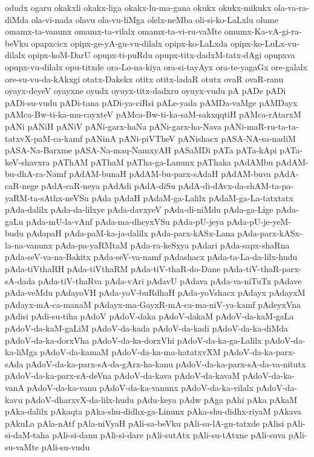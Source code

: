 {odudx
ogaru
okakxli
okakx-liga
okakx-lu-ma-gana
okukx
okukx-mikukx
ola-va-ra-diMda
ola-vi-nada
olavu
ola-vu-liMga
olelx-neMba
oli-si-ko-LaLxlu
olume
omamx-ta-vanunx
omamx-ta-vilalx
omamx-ta-vi-ru-vaMte
omumx-Ka-vA-gi-ra-beVku
opapxcicx
opipx-ge-yA-gu-vu-dilalx
opipx-ko-LaLxda
opipx-ko-LuLx-vu-dilalx
opipx-koM-DarU
opupx-ti-puRdu
opupx-titx-dadxM-tatx-dAgi
opupxva
opupx-vu-dilalx
opu-titxde
ora-Lo-na-kiya
ora-si-tayAyx
ora-te-yagaGx
ore-galalx
ore-su-vu-da-kAkxgi
otatx-Dakekx
otitx
otitx-ladaR
otutx
ovaR
ovaR-ranu
oyayx-deyeV
oyayxne
oyudx
oyuyx-titx-dadxru
oyuyx-vudu
pA
pADe
pADi
pADi-su-vudu
pADi-tana
pADi-ya-ciRsi
pALe-yada
pAMDa-vaMge
pAMDayx
pAMca-Bw-ti-ka-mu-cayxteV
pAMca-Bw-ti-ka-saM-sakxqqtiH
pAMca-rAtarxM
pANi
pANiH
pANiV
pANi-garx-haNa
pANi-garx-ha-Nava
pANi-maR-ru-ta-ta-tatxvX-paM-ca-kamf
pANinA
pANi-piVTheV
pANishacx
pASA-NA-sa-nadiM
pASA-Na-Barxme
pASA-Na-maq-NamxyAH
pASaMDi
pATa
pATa-kApi
pATa-keV-shavxra
pAThAM
pAThaM
pATha-ga-Lanunx
pAThaka
pAdAMbu
pAdAM-bu-dhA-ra-Namf
pAdAM-bunaH
pAdAM-bu-parx-sAdaH
pAdAM-buva
pAdA-caR-nege
pAdA-caR-neya
pAdAdi
pAdA-diSu
pAdA-di-dAvx-da-shAM-ta-pa-yaRM-ta-sAthx-neVSu
pAda
pAdaH
pAdaM-ga-Lalilx
pAdaM-ga-La-tatxtatx
pAda-dalilx
pAda-da-lilxye
pAda-davxyeV
pAda-di-niMdu
pAda-ga-Lige
pAda-gaLu
pAda-mU-la-vAnf
pAda-ma-dheyxVSu
pAda-pU-jeya
pAda-pU-je-yeM-budu
pAdapaH
pAda-paM-ka-ja-dalilx
pAda-parx-kASx-Lana
pAda-parx-kASx-la-na-vanunx
pAda-pa-yaRMtaM
pAda-ra-keSxya
pAdari
pAda-sapx-shaRna
pAda-seV-va-na-Bakitx
pAda-seV-va-namf
pAdashacx
pAda-ta-La-da-lilx-hudu
pAda-tiVthaRH
pAda-tiVthaRM
pAda-tiV-thaR-do-Dane
pAda-tiV-thaR-parx-sA-dada
pAda-tiV-thaRva
pAda-vAri
pAdavU
pAdava
pAda-va-niTuTx
pAdave
pAda-veMdu
pAdayoVH
pAda-yoV-buRdhaH
pAda-yoVshacx
pAdayx
pAdayxM
pAdayx-mA-ca-manaM
pAdayx-ma-GayxR-mA-ca-ma-niV-ya-kamf
pAdeyxVna
pAdisi
pAdi-su-tiha
pAdoV
pAdoV-daka
pAdoV-dakaM
pAdoV-da-kaM-gaLa
pAdoV-da-kaM-gaLiM
pAdoV-da-kada
pAdoV-da-kadi
pAdoV-da-ka-diMda
pAdoV-da-ka-dorxVha
pAdoV-da-ka-dorxVhi
pAdoV-da-ka-ga-Lalilx
pAdoV-da-ka-liMga
pAdoV-da-kamaM
pAdoV-da-ka-ma-hatatxvXM
pAdoV-da-ka-parx-sAda
pAdoV-da-ka-parx-sA-da-gArx-ha-kanu
pAdoV-da-ka-parx-sA-da-va-nitutx
pAdoV-da-ka-parx-sA-deVna
pAdoV-da-kava
pAdoV-da-kavaM
pAdoV-da-ka-vanA
pAdoV-da-ka-vanu
pAdoV-da-ka-vanunx
pAdoV-da-ka-vilalx
pAdoV-da-kavu
pAdoV-dharxvX-da-lilx-hudu
pAdu-keya
pAdw
pAga
pAhi
pAka
pAkaM
pAka-dalilx
pAkaqta
pAka-shu-didhx-ga-Linunx
pAka-shu-didhx-riyaM
pAkava
pAkuLa
pAla-nAtf
pAla-niVyaH
pAli-sa-beVku
pAli-sa-lA-gu-tatxde
pAlisi
pAli-si-daM-taha
pAli-si-danu
pAli-si-dare
pAli-sutAtx
pAli-su-tAtxne
pAli-suva
pAli-su-vaMte
pAli-su-vudu
}
